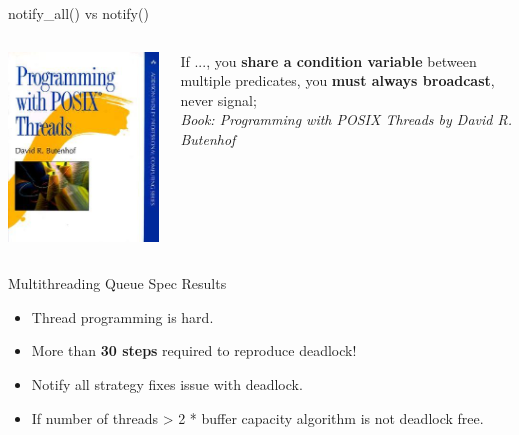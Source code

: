 \documentclass[12pt]{beamer}
\begin{document}
  \begin{frame}{notify\_all() vs notify()}
    \begin{columns}[T] %
      \begin{column}{.48\textwidth}
        \begin{center}
            \includegraphics[scale=3.0]{figures/posix_threads}
        \end{center}
      \end{column}%
      \begin{column}{.48\textwidth}
          If ..., you \textbf{share a condition variable} between multiple
          predicates, you \textbf{must always broadcast}, never signal; \\
          \textit{Book: Programming with POSIX Threads by David R. Butenhof}
      \end{column}%
    \end{columns}
  \end{frame}
  \begin{frame}{Multithreading Queue Spec Results}
    \begin{itemize}
      \item Thread programming is hard.
      \item More than \textbf{30 steps} required to reproduce deadlock!
      \item Notify all strategy fixes issue with deadlock.
      \item If number of threads > 2 * buffer capacity algorithm is not deadlock free.
    \end{itemize}
  \end{frame}
\end{document}
